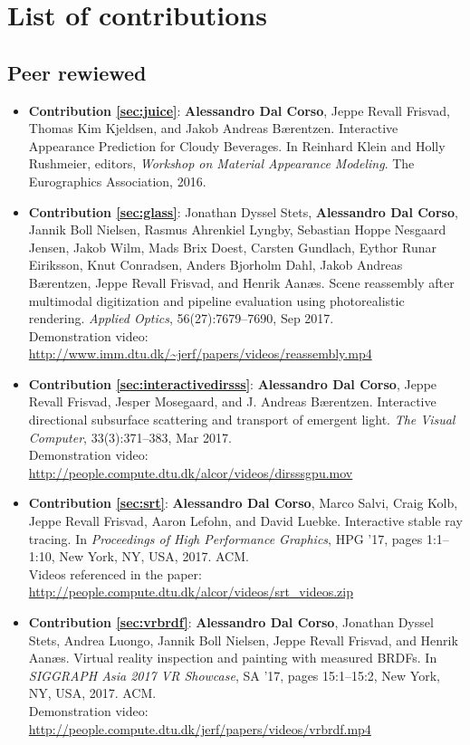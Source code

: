 \chapter*{List of contributions}
\label{sec:contributionlist}
\section*{Peer rewiewed}
\begin{itemize}
\item \textbf{Contribution \ref{sec:juice}}: \textbf{Alessandro Dal Corso}, Jeppe Revall Frisvad, Thomas Kim Kjeldsen, and Jakob Andreas Bærentzen. Interactive Appearance Prediction for Cloudy Beverages. In Reinhard Klein and Holly Rushmeier, editors, \textit{Workshop on Material Appearance Modeling}. The Eurographics Association, 2016.~\cite{dalcorsomam16}
\item \textbf{Contribution \ref{sec:glass}}: Jonathan Dyssel Stets, \textbf{Alessandro Dal Corso}, Jannik Boll Nielsen, Rasmus Ahrenkiel Lyngby, Sebastian Hoppe Nesgaard Jensen, Jakob Wilm, Mads Brix Doest, Carsten Gundlach, Eythor Runar Eiriksson, Knut Conradsen, Anders Bjorholm Dahl, Jakob Andreas Bærentzen, Jeppe Revall Frisvad, and Henrik Aanæs. Scene reassembly after multimodal digitization and pipeline evaluation using photorealistic rendering. \textit{Applied Optics}, 56(27):7679–7690, Sep 2017.~\cite{stets17} \\ Demonstration video: \url{http://www.imm.dtu.dk/~jerf/papers/videos/reassembly.mp4}
\item \textbf{Contribution \ref{sec:interactivedirsss}}: \textbf{Alessandro Dal Corso}, Jeppe Revall Frisvad, Jesper Mosegaard, and J. Andreas Bærentzen. Interactive directional subsurface scattering and transport of emergent light. \textit{The Visual Computer}, 33(3):371–383, Mar 2017.~\cite{dalcorso17dirsss} \\ Demonstration video: \url{http://people.compute.dtu.dk/alcor/videos/dirsssgpu.mov}
\item \textbf{Contribution \ref{sec:srt}}: \textbf{Alessandro Dal Corso}, Marco Salvi, Craig Kolb, Jeppe Revall Frisvad, Aaron Lefohn, and David Luebke. Interactive stable ray tracing. In \textit{Proceedings of High Performance Graphics}, HPG ’17, pages 1:1–1:10, New York, NY, USA, 2017. ACM. \cite{dalcorso17hpg} \\ Videos referenced in the paper: \url{http://people.compute.dtu.dk/alcor/videos/srt_videos.zip}
\item \textbf{Contribution \ref{sec:vrbrdf}}: \textbf{Alessandro Dal Corso}, Jonathan Dyssel Stets, Andrea Luongo, Jannik Boll Nielsen, Jeppe Revall Frisvad, and Henrik Aanæs. Virtual reality inspection and painting with measured BRDFs. In \textit{SIGGRAPH Asia 2017 VR Showcase}, SA ’17, pages 15:1–15:2, New York, NY, USA, 2017. ACM.~\cite{dalcorso17vr} \\ Demonstration video: \url{http://people.compute.dtu.dk/jerf/papers/videos/vrbrdf.mp4}
\end{itemize}

